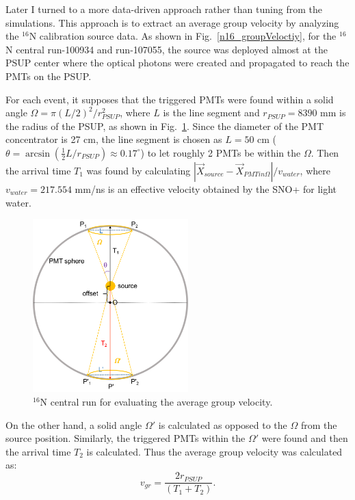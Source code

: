 Later I turned to a more data-driven approach rather than tuning from the simulations. This approach is to extract an average group velocity by analyzing the $^{16}$N calibration source data. As shown in Fig.~\ref{n16_groupVeloctiy}, for the $^{16}$N central run-100934 and run-107055, the source was deployed almost at the PSUP center where the optical photons were created and propagated to reach the PMTs on the PSUP. 

For each event, it supposes that the triggered PMTs were found within a solid angle $\Omega=\pi(L/2)^2/r^2_{PSUP}$, where $L$ is the line segment and $r_{PSUP}=8390$ mm is the radius of the PSUP, as shown in Fig.~\ref{fig:n16_groupVeloctiy}. Since the diameter of the PMT concentrator is 27 cm, the line segment is chosen as $L = 50$ cm ($\theta=\arcsin(\frac{1}{2}L/r_{PSUP})\approx 0.17^\circ$) to let roughly 2 PMTs be within the $\Omega$. Then the arrival time $T_1$ was found by calculating $|\vec{X}_{source}-\vec{X}_{PMTin\Omega}|/v_{water}$, where $v_{water}=217.554$ mm/ns is an effective velocity obtained by the SNO+ for light water\cite{coulter2013modelling}.

\begin{figure}[!htb]
	\centering
	\includegraphics[width=6cm]{n16_groupVelocity.png}
	\caption{$^{16}$N central run for evaluating the average group velocity.}
	\label{fig:n16_groupVeloctiy}
\end{figure}

On the other hand, a solid angle $\Omega'$ is calculated as opposed to the $\Omega$ from the source position. Similarly, the triggered PMTs within the $\Omega'$ were found and then the arrival time $T_2$ is calculated. Thus the average group velocity was calculated as:
\begin{equation}
v_{gr}=\frac{2 r_{PSUP}}{(T_1+T_2)}.
\end{equation}

